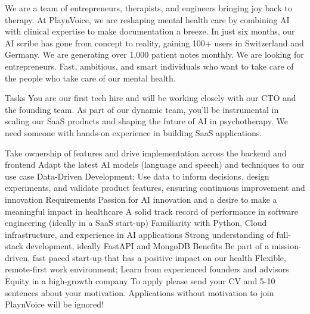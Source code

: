 We are a team of entrepreneurs, therapists, and engineers bringing joy back to therapy. At PlaynVoice, we are reshaping mental health care by combining AI with clinical expertise to make documentation a breeze. In just six months, our AI scribe has gone from concept to reality, gaining 100+ users in Switzerland and Germany. We are generating over 1,000 patient notes monthly. We are looking for entrepreneurs. Fast, ambitious, and smart individuals who want to take care of the people who take care of our mental health.

Tasks
You are our first tech hire and will be working closely with our CTO and the founding team. As part of our dynamic team, you’ll be instrumental in scaling our SaaS products and shaping the future of AI in psychotherapy. We need someone with hands-on experience in building SaaS applications.

Take ownership of features and drive implementation across the backend and frontend
Adapt the latest AI models (language and speech) and techniques to our use case
Data-Driven Development: Use data to inform decisions, design experiments, and validate product features, ensuring continuous improvement and innovation
Requirements
Passion for AI innovation and a desire to make a meaningful impact in healthcare
A solid track record of performance in software engineering (ideally in a SaaS start-up)
Familiarity with Python, Cloud infrastructure, and experience in AI applications
Strong understanding of full-stack development, ideally FastAPI and MongoDB
Benefits
Be part of a mission-driven, fast paced start-up that has a positive impact on our health
Flexible, remote-first work environment; Learn from experienced founders and advisors
Equity in a high-growth company
To apply please send your CV and 5-10 sentences about your motivation. Applications without motivation to join PlaynVoice will be ignored!

